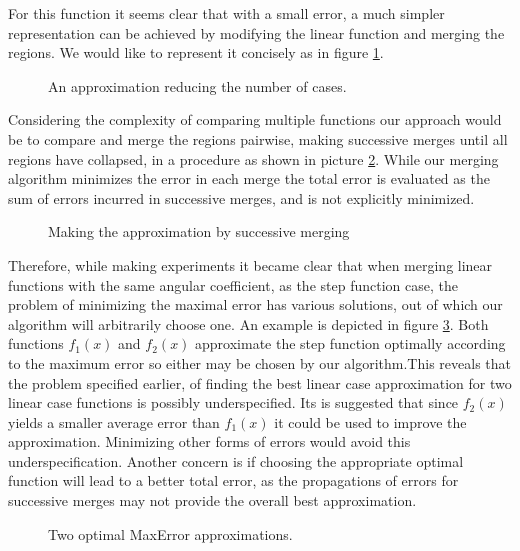 For this function it seems clear that with a small error, a much simpler representation can be achieved by modifying the linear function and merging the regions. We would like to represent it concisely as in figure \ref{steplin}.
\begin{figure}[h]
\center
{}%
\caption{An approximation reducing the number of cases.}
\label{steplin} 
\end{figure}
Considering the complexity of comparing multiple functions our approach would be to compare and merge the regions pairwise, making successive merges until all regions have collapsed, in a procedure as shown in picture \ref{steplining}. While our merging algorithm minimizes the error in each merge the total error is evaluated as the sum of errors incurred in successive merges, and is not explicitly minimized.

\begin{figure}[!h]
\centering
\begin{minipage}{.7\textwidth}
  \centering
\end{minipage}
\begin{minipage}{.7\textwidth}
\centering
{}
\end{minipage}
\begin{minipage}{.7\textwidth}
\centering
{}
\end{minipage}
\caption{ Making the approximation by successive merging}
 \label{steplining}
\end{figure}

Therefore, while making experiments it became clear that when merging linear functions with the same angular coefficient, as the step function case, the problem of minimizing the maximal error has various solutions, out of which our algorithm will arbitrarily choose one. An example is depicted in figure \ref{steplin2}. Both functions $f_1(x)$ and $f_2(x)$ approximate the step function optimally according to the maximum error so either may be chosen by our algorithm.This reveals that the problem specified earlier, of finding the best linear case approximation for two linear case functions is possibly underspecified.  Its is suggested that since $f_2(x)$ yields a smaller average error than $f_1(x)$ it could be used to improve the approximation. Minimizing other forms of errors would avoid this underspecification. Another concern is if choosing the appropriate optimal function will lead to a better total error, as the propagations of errors for successive merges may not provide the overall best approximation.
\begin{figure}[h]
\center
{}%
\caption{Two optimal MaxError approximations.}
\label{steplin2} 
\end{figure}
